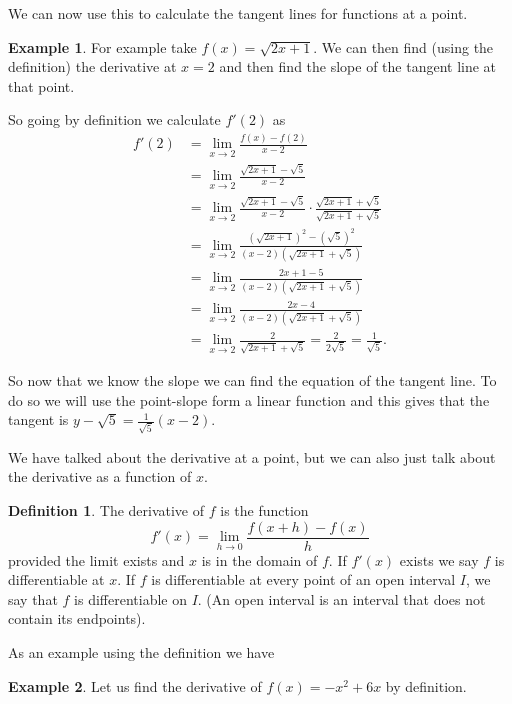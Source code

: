 \documentclass[12pt,reqno]{article}
\theoremstyle{definition}
\newtheorem*{Definition}{Definition}
\newtheorem*{Example}{Example}
\begin{document}
We can now use this to calculate the tangent lines for functions at a point. 
\begin{Example}
	For example take $f(x) = \sqrt{2x + 1}$. We can then find (using the definition) the derivative at $x = 2$ and then find the slope of the tangent line at that point. 
	
	So going by definition we calculate $f'(2)$ as 
	\begin{align*}
		f'(2) &= \lim_{x \to 2} \frac{f(x) - f(2)}{x - 2} \\
			  &= \lim_{x \to 2} \frac{\sqrt{2x + 1} - \sqrt{5}}{x - 2} \\
			  &= \lim_{x \to 2} \frac{\sqrt{2x + 1} - \sqrt{5}}{x - 2} \cdot \frac{\sqrt{2x + 1} + \sqrt{5}}{\sqrt{2x + 1} + \sqrt{5}} \\
			  &= \lim_{x \to 2} \frac{(\sqrt{2x + 1})^2 - (\sqrt{5})^2}{(x - 2) (\sqrt{2x + 1} + \sqrt{5})} \\
			  &= \lim_{x \to 2} \frac{2x + 1 - 5} {(x - 2)(\sqrt{2x + 1} + \sqrt{5})} \\
			  &= \lim_{x \to 2} \frac{2x - 4}{(x - 2)(\sqrt{2x + 1} + \sqrt{5})} \\
			  &= \lim_{x \to 2} \frac{2}{\sqrt{2x + 1} + \sqrt{5}} = \frac{2}{2\sqrt{5}} = \frac{1}{\sqrt{5}}.
	\end{align*}

	So now that we know the slope we can find the equation of the tangent line. To do so we will use the point-slope form a linear function and this gives that the tangent is $y - \sqrt{5} = \frac{1}{\sqrt{5}} (x - 2)$. 
\end{Example}

We have talked about the derivative at a point, but we can also just talk about the derivative as a function of $x$. 
\begin{Definition}
	The derivative of $f$ is the function $$f'(x) = \lim_{h \to 0} \frac{f(x + h) - f(x)}{h}$$ provided the limit exists and $x$ is in the domain of $f$. If $f'(x)$ exists we say $f$ is differentiable at $x$. If $f$ is differentiable at every point of an open interval $I$, we say that $f$ is differentiable on $I$.  (An open interval is an interval that does not contain its endpoints). 
\end{Definition}

As an example using the definition we have
\begin{Example}
	Let us find the derivative of $f(x) = -x^2 + 6x$ by definition. 
\end{Example}
\end{document}
